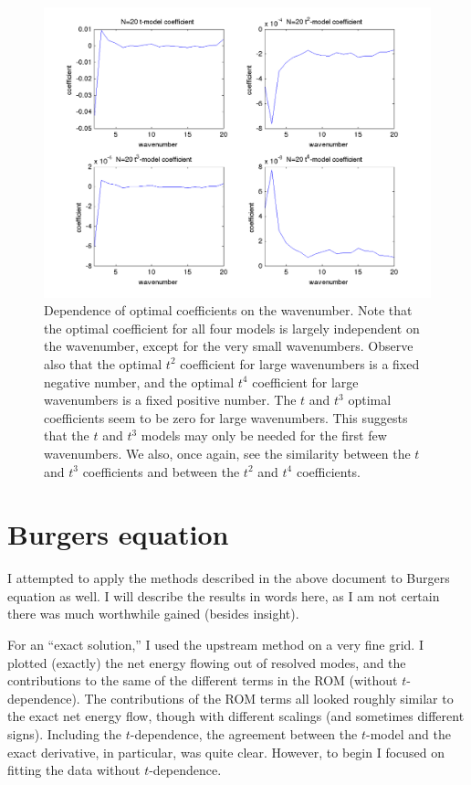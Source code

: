 \documentclass{article}
\begin{document}
\begin{figure}[h]
\includegraphics[width=\textwidth]{N20_k_coeffs.png}
\caption{Dependence of optimal coefficients on the wavenumber. Note that the optimal coefficient for all four models is largely independent on the wavenumber, except for the very small wavenumbers. Observe also that the optimal $t^2$ coefficient for large wavenumbers is a fixed negative number, and the optimal $t^4$ coefficient for large wavenumbers is a fixed positive number. The $t$ and $t^3$ optimal coefficients seem to be zero for large wavenumbers. This suggests that the $t$ and $t^3$ models may only be needed for the first few wavenumbers. We also, once again, see the similarity between the $t$ and $t^3$ coefficients and between the $t^2$ and $t^4$ coefficients.}\label{fig:wavenumber_dependence}
\end{figure}

\section{Burgers equation}

I attempted to apply the methods described in the above document to Burgers equation as well. I will describe the results in words here, as I am not certain there was much worthwhile gained (besides insight).

For an ``exact solution,'' I used the upstream method on a very fine grid. I plotted (exactly) the net energy flowing out of resolved modes, and the contributions to the same of the different terms in the ROM (without $t$-dependence). The contributions of the ROM terms all looked roughly similar to the exact net energy flow, though with different scalings (and sometimes different signs). Including the $t$-dependence, the agreement between the $t$-model and the exact derivative, in particular, was quite clear. However, to begin I focused on fitting the data without $t$-dependence.
\end{document}
